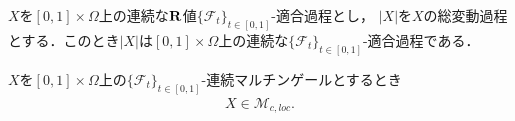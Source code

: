 	\begin{screen}
		\begin{thm}[適合過程の総変動過程は適合]
			$X$を$[0,1] \times \Omega$上の連続な$\mathbf{R}$値$\{\mathscr{F}_{t}\}_{t \in [0,1]}$-適合過程とし，
			$|X|$を$X$の総変動過程とする．このとき$|X|$は$[0,1] \times \Omega$上の連続な$\{\mathscr{F}_{t}\}_{t \in [0,1]}$-適合過程である．
		\end{thm}
	\end{screen}
	
	\begin{sketch}
	
	\end{sketch}
	
	\begin{screen}
		\begin{thm}[マルチンゲールは局所マルチンゲール]
			$X$を$[0,1] \times \Omega$上の$\{\mathscr{F}_{t}\}_{t \in [0,1]}$-連続マルチンゲールとするとき
			\begin{align}
				X \in \mathscr{M}_{c,loc}.
			\end{align}
		\end{thm}
	\end{screen}
	
	\begin{sketch}
		
	\end{sketch}
	
